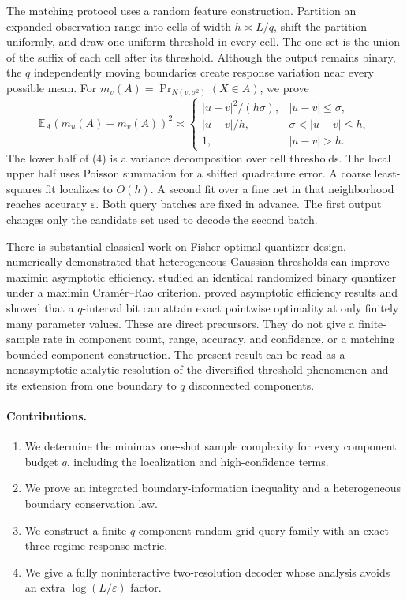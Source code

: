\documentclass{article}
\theoremstyle{definition}
\theoremstyle{remark}
\newcommand{\E}{\mathbb E}
\newcommand{\1}{\mathbf 1}
\begin{document}
The matching protocol uses a random feature construction. Partition an expanded observation range into cells of width \(h\asymp L/q\), shift the partition uniformly, and draw one uniform threshold in every cell. The one-set is the union of the suffix of each cell after its threshold. Although the output remains binary, the \(q\) independently moving boundaries create response variation near every possible mean. For \(m_v(A)=\Pr_{N(v,\sigma^2)}(X\in A)\), we prove \[ \E_A(m_u(A)-m_v(A))^2 \asymp
\begin{cases}
|u-v|^2/(h\sigma),& |u-v|\leq\sigma,\\
|u-v|/h,& \sigma<|u-v|\leq h,\\
1,& |u-v|>h.
\end{cases}
\tag{4} \] The lower half of (4) is a variance decomposition over cell thresholds. The local upper half uses Poisson summation for a shifted quadrature error. A coarse least-squares fit localizes to \(O(h)\). A second fit over a fine net in that neighborhood reaches accuracy \(\varepsilon\). Both query batches are fixed in advance. The first output changes only the candidate set used to decode the second batch.

There is substantial classical work on Fisher-optimal quantizer design. \citet{venkitasubramaniam2007quantization} numerically demonstrated that heterogeneous Gaussian thresholds can improve maximin asymptotic efficiency. \citet{kar2012optimal} studied an identical randomized binary quantizer under a maximin Cram\'er--Rao criterion. \citet{kipnis2022mean} proved asymptotic efficiency results and showed that a \(q\)-interval bit can attain exact pointwise optimality at only finitely many parameter values. These are direct precursors. They do not give a finite-sample rate in component count, range, accuracy, and confidence, or a matching bounded-component construction. The present result can be read as a nonasymptotic analytic resolution of the diversified-threshold phenomenon and its extension from one boundary to \(q\) disconnected components.

\paragraph{Contributions.}
\begin{enumerate}
\item We determine the minimax one-shot sample complexity for every component budget \(q\), including the localization and high-confidence terms.
\item We prove an integrated boundary-information inequality and a heterogeneous boundary conservation law.
\item We construct a finite \(q\)-component random-grid query family with an exact three-regime response metric.
\item We give a fully noninteractive two-resolution decoder whose analysis avoids an extra \(\log(L/\varepsilon)\) factor.
\end{enumerate}
\end{document}
